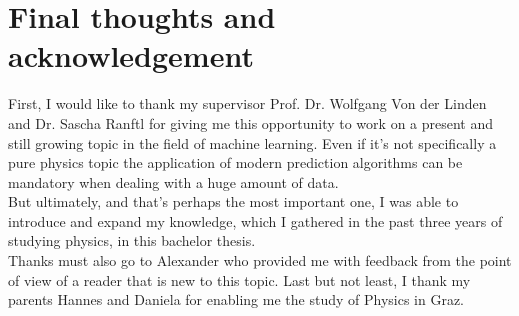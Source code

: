 \documentclass[12pt, a4paper]{article}
\begin{document}
\section{Final thoughts and acknowledgement}
First, I would like to thank my supervisor Prof. Dr. Wolfgang Von der Linden and Dr. Sascha Ranftl for giving me this opportunity to work on a present and still growing topic in the field of machine learning. Even if it's not specifically a pure physics topic the application of modern prediction algorithms can be mandatory when dealing with a huge amount of data. \\
But ultimately, and that's perhaps the most important one, I was able to
introduce and expand my knowledge, which I gathered in the past three years of studying physics, in this bachelor thesis. \\
Thanks must also go to Alexander who provided me with feedback from the
point of view of a reader that is new to this topic. Last but not least, I thank my parents Hannes and Daniela for enabling me the study of Physics in Graz. 
\newpage
\printbibliography
\newpage
\listoffigures
\end{document}
